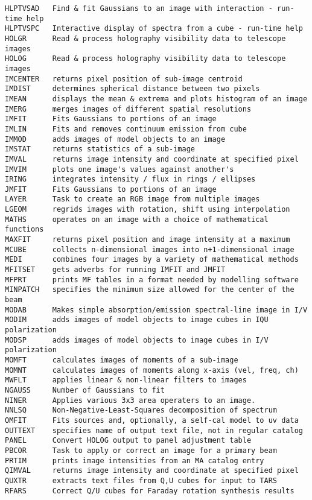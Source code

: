 \begin{verbatim}
HLPTVSAD   Find & fit Gaussians to an image with interaction - run-time help
HLPTVSPC   Interactive display of spectra from a cube - run-time help
HOLGR      Read & process holography visibility data to telescope images
HOLOG      Read & process holography visibility data to telescope images
IMCENTER   returns pixel position of sub-image centroid
IMDIST     determines spherical distance between two pixels
IMEAN      displays the mean & extrema and plots histogram of an image
IMERG      merges images of different spatial resolutions
IMFIT      Fits Gaussians to portions of an image
IMLIN      Fits and removes continuum emission from cube
IMMOD      adds images of model objects to an image
IMSTAT     returns statistics of a sub-image
IMVAL      returns image intensity and coordinate at specified pixel
IMVIM      plots one image's values against another's
IRING      integrates intensity / flux in rings / ellipses
JMFIT      Fits Gaussians to portions of an image
LAYER      Task to create an RGB image from multiple images
LGEOM      regrids images with rotation, shift using interpolation
MATHS      operates on an image with a choice of mathematical functions
MAXFIT     returns pixel position and image intensity at a maximum
MCUBE      collects n-dimensional images into n+1-dimensional image
MEDI       combines four images by a variety of mathematical methods
MFITSET    gets adverbs for running IMFIT and JMFIT
MFPRT      prints MF tables in a format needed by modelling software
MINPATCH   specifies the minimum size allowed for the center of the beam
MODAB      Makes simple absorption/emission spectral-line image in I/V
MODIM      adds images of model objects to image cubes in IQU polarization
MODSP      adds images of model objects to image cubes in I/V polarization
MOMFT      calculates images of moments of a sub-image
MOMNT      calculates images of moments along x-axis (vel, freq, ch)
MWFLT      applies linear & non-linear filters to images
NGAUSS     Number of Gaussians to fit
NINER      Applies various 3x3 area operaters to an image.
NNLSQ      Non-Negative-Least-Squares decomposition of spectrum
OMFIT      Fits sources and, optionally, a self-cal model to uv data
OUTTEXT    specifies name of output text file, not in regular catalog
PANEL      Convert HOLOG output to panel adjustment table
PBCOR      Task to apply or correct an image for a primary beam
PRTIM      prints image intensities from an MA catalog entry
QIMVAL     returns image intensity and coordinate at specified pixel
QUXTR      extracts text files from Q,U cubes for input to TARS
RFARS      Correct Q/U cubes for Faraday rotation synthesis results

\end{verbatim}
